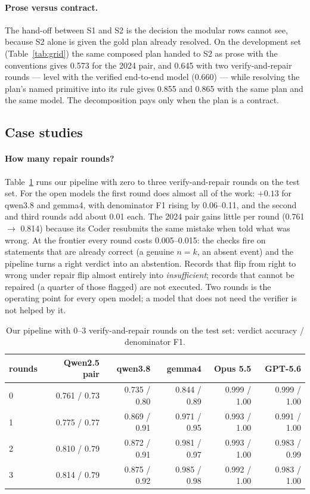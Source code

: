 \paragraph{Prose versus contract.} The hand-off between S1 and S2 is the
decision the modular rows cannot see, because S2 alone is given the gold plan
already resolved. On the development set (Table~\ref{tab:grid}) the same
composed plan handed to S2 as prose with the conventions gives 0.573 for the
2024 pair, and 0.645 with two verify-and-repair rounds --- level with the
verified end-to-end model (0.660) --- while resolving the plan's named
primitive into its rule gives 0.855 and 0.865 with the same plan and the same
model. The decomposition pays only when the plan is a contract.

\subsection{Case studies}
\label{sec:cases}

\paragraph{How many repair rounds?} Table~\ref{tab:rounds} runs our pipeline
with zero to three verify-and-repair rounds on the test set. For the open
models the first round does almost all of the work: $+0.13$ for qwen3.8 and
gemma4, with denominator F1 rising by 0.06--0.11, and the second and third
rounds add about 0.01 each. The 2024 pair gains little per round (0.761
$\rightarrow$ 0.814) because its Coder resubmits the same mistake when told
what was wrong. At the frontier every round costs 0.005--0.015: the checks
fire on statements that are already correct (a genuine $n = k$, an absent
event) and the pipeline turns a right verdict into an abstention. Records
that flip from right to wrong under repair flip almost entirely into
\emph{insufficient}; records that cannot be repaired (a quarter of those
flagged) are not executed. Two rounds is the operating point for every open
model; a model that does not need the verifier is not helped by it.

\begin{table}[t]
\centering
\small
\setlength{\tabcolsep}{4pt}
\begin{tabular}{lrrrrr}
\toprule
rounds & Qwen2.5 pair & qwen3.8 & gemma4 & Opus 5.5 & GPT-5.6 \\
\midrule
0 & 0.761 / 0.73 & 0.735 / 0.80 & 0.844 / 0.89 & 0.999 / 1.00 & 0.999 / 1.00 \\
1 & 0.775 / 0.77 & 0.869 / 0.91 & 0.971 / 0.95 & 0.993 / 1.00 & 0.991 / 1.00 \\
2 & 0.810 / 0.79 & 0.872 / 0.91 & 0.981 / 0.97 & 0.993 / 1.00 & 0.983 / 0.99 \\
3 & 0.814 / 0.79 & 0.875 / 0.92 & 0.985 / 0.98 & 0.992 / 1.00 & 0.983 / 1.00 \\
\bottomrule
\end{tabular}
\caption{Our pipeline with 0--3 verify-and-repair rounds on the test set:
verdict accuracy / denominator F1.}
\label{tab:rounds}
\end{table}

